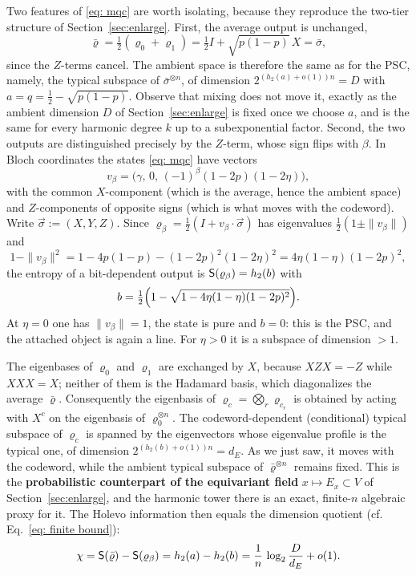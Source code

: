 \documentclass[11pt]{amsart}
\theoremstyle{plain}
\theoremstyle{remark}
\begin{document}
Two features of \eqref{eq: mqc} are worth isolating, because they reproduce the
two-tier structure of Section~\ref{sec:enlarge}. First, the average output is
unchanged,
\[
 \bar\varrho=\tfrac12(\varrho_0+\varrho_1)
 =\tfrac12 I+\sqrt{p(1-p)}\,X=\bar\sigma ,
\]
since the $Z$-terms cancel. The ambient space is therefore the same as for the
PSC, namely, the typical subspace of $\bar\sigma^{\otimes n}$, of dimension
$2^{(h_2(a)+o(1))n}=D$ with $a=q=\frac12-\sqrt{p(1-p)}$. Observe that mixing does not
move it, exactly as the ambient dimension $D$ of Section~\ref{sec:enlarge} is fixed once we choose $a$,
and is the same for every harmonic degree $k$ up to a subexponential factor.
Second, the two outputs are distinguished precisely by the $Z$-term,
whose sign flips with $\beta$. In Bloch coordinates the states \eqref{eq: mqc} have
vectors \cite[p.31]{AG26}
\[
 v_\beta=\bigl(\gamma,\,0,\,(-1)^{\beta}(1-2p)(1-2\eta)\bigr),
\]
with the common $X$-component (which is the average, hence the ambient space) and
$Z$-components of opposite signs (which is what moves with the codeword). Write $\vec\sigma:=(X,Y,Z)$. Since
$\varrho_\beta=\frac12(I+v_\beta\cdot\vec\sigma)$ has eigenvalues
$\frac12(1\pm\|v_\beta\|)$ and
\[
 1-\|v_\beta\|^{2}=1-4p(1-p)-(1-2p)^{2}(1-2\eta)^{2}=4\eta(1-\eta)(1-2p)^{2},
\]
the entropy of a bit-dependent output is ${\sf S}(\varrho_\beta)=h_2(b)$ with
\begin{equation}\label{eq: b-mqc}
 b=\tfrac12\Bigl(1-\sqrt{1-4\eta(1-\eta)(1-2p)^{2}}\Bigr) .
\end{equation}
 At $\eta=0$ one has $\|v_\beta\|=1$, the state is pure and $b=0$: this is the PSC,
and the attached object is again a line. For $\eta>0$ it is a subspace of dimension $>1$.

The eigenbases of $\varrho_0$ and $\varrho_1$ are exchanged by $X$, because
$XZX=-Z$ while $XXX=X$; neither of them is the Hadamard basis, which
diagonalizes the average $\bar\varrho$. Consequently the eigenbasis of
$\varrho_c=\bigotimes_r\varrho_{c_r}$ is obtained by acting with $X^{c}$ on the eigenbasis of 
$\varrho_0^{\otimes n}$. The 
codeword-dependent (conditional) typical subspace of $\varrho_c$ is spanned by the eigenvectors
whose eigenvalue profile is the typical one, of dimension
$2^{(h_2(b)+o(1))n}=d_E$. As we just saw, it moves with the codeword, while the ambient typical
subspace of $\bar\varrho^{\otimes n}$ remains fixed. This is the {\bf probabilistic
counterpart of the equivariant field} $x\mapsto E_x\subset V$ of
Section~\ref{sec:enlarge}, and the harmonic tower there is an exact, finite-$n$
algebraic proxy for it. The Holevo information then equals the
dimension quotient (cf. Eq.~\eqref{eq: finite bound}):
\begin{equation}\label{eq: holevo}
 \chi={\sf S}(\bar\varrho)-{\sf S}(\varrho_\beta)=h_2(a)-h_2(b)=\frac1n\,\log_2\frac{D}{d_E}+o(1).
\end{equation}
\end{document}
